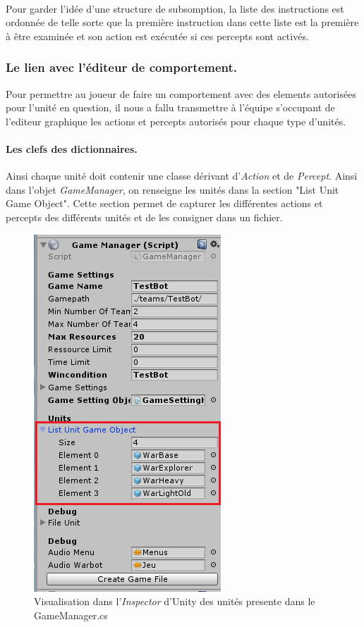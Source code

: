 \documentclass{report}
\begin{document}
\paragraph{}Pour garder l'idée d'une structure de subsomption, la liste des instructions est ordonnée de telle sorte que la première instruction dans cette liste est la première à être examinée et son action est exécutée si ces percepts sont activés.
\subsubsection{Le lien avec l'éditeur de comportement.}
Pour permettre au joueur de faire un comportement avec des elements autorisées pour l'unité en question, il nous a fallu transmettre à l'équipe s'occupant de l'editeur graphique les actions et percepts autorisés pour chaque type d'unités.
\paragraph{Les clefs des dictionnaires.} Ainsi chaque unité doit contenir une classe dérivant d'\textit{Action} et de \textit{Percept}.
Ainsi dans l'objet \textit{GameManager}, on renseigne les unités dans la section "List Unit Game Object". Cette section permet de capturer les différentes actions et percepts des différents unités et de les consigner dans un fichier.
\begin{figure}[!h]
\centering
\includegraphics{GameManagerImage}
\caption{Visualisation dans l'\textit{Inspector} d'Unity des unités presente dans le GameManager.cs}
\end{figure}
\end{document}
